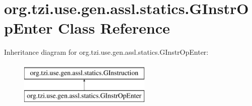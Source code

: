 \hypertarget{classorg_1_1tzi_1_1use_1_1gen_1_1assl_1_1statics_1_1_g_instr_op_enter}{\section{org.\-tzi.\-use.\-gen.\-assl.\-statics.\-G\-Instr\-Op\-Enter Class Reference}
\label{classorg_1_1tzi_1_1use_1_1gen_1_1assl_1_1statics_1_1_g_instr_op_enter}
}
Inheritance diagram for org.\-tzi.\-use.\-gen.\-assl.\-statics.\-G\-Instr\-Op\-Enter\-:\begin{figure}[H]
\begin{center}
\leavevmode
\includegraphics[height=2.000000cm]{classorg_1_1tzi_1_1use_1_1gen_1_1assl_1_1statics_1_1_g_instr_op_enter}
\end{center}
\end{figure}

